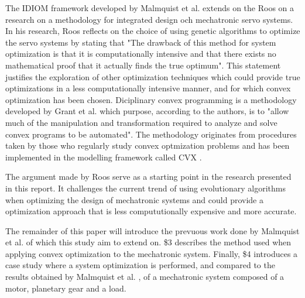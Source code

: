 \par

The IDIOM framework developed by Malmquist et al. extends on the Roos \cite{Roos} on a research on a methodology for integrated design och mechatronic servo systems. In his research, Roos reflects on the choice of using genetic algorithms to optimize the servo systems by stating that "The drawback of this method for system optimization is that it is computationally intensive and that there exists no mathematical proof that it actually finds the true optimum". This statement justifies the exploration of other optimization techniques which could provide true optimizations in a less computationally intensive manner, and for which convex optimization has been chosen. Diciplinary convex programming is a methodology developed by Grant et al. \cite{Grant} which purpose, according to the authors, is to "allow much of the manipulation and transformation required to analyze and solve convex programs to be automated". The methodology originates from procedures taken by those who regularly study convex optmization problems and has been implemented in the modelling framework called CVX \cite{CVX}.  

\par
The argument made by Roos serve as a starting point in the research presented in this report. It challenges the current trend of using evolutionary algorithms when optimizing the design of mechatronic systems and could provide a optimization approach that is less compututionally expensive and more accurate. 

\par
The remainder of this paper will introduce the prevuous work done by Malmquist et al. of which this study aim to extend on. \$3 describes the method used when applying convex optimization to the mechatronic system. Finally, \$4 introduces a case study where a system optimization is performed, and compared to the results obtained by Malmquist et al.  , of a mechatronic system composed of a motor, planetary gear and a load.  



